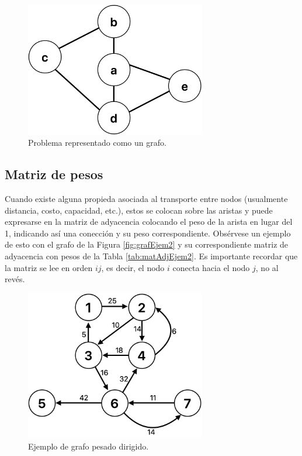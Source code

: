 \documentclass[12pt]{article}  %
\begin{document}
\begin{figure}[H]
\centering
\caption{Problema representado como un grafo.}
\label{fig:grafEjem}
\includegraphics[width=0.7\textwidth]{grafoEjemploAdj.png}
\end{figure}

\subsection{Matriz de pesos}
Cuando existe alguna propieda asociada al transporte entre nodos (usualmente distancia, costo, capacidad, etc.), estos se colocan sobre las aristas y puede expresarse en la matriz de adyacencia colocando el peso de la arista en lugar del 1, indicando así una conección y su peso correspondiente. Obsérvese un ejemplo de esto con el grafo de la Figura \ref{fig:grafEjem2} y su correspondiente matriz de adyacencia con pesos de la Tabla \ref{tab:matAdjEjem2}.
Es importante recordar que la matriz se lee en orden $ij$, es decir, el nodo $i$ conecta hacia el nodo $j$, no al revés.

\begin{figure}[H]
\centering
\caption{Ejemplo de grafo pesado dirigido.}
\label{fig:grafEjem}
\includegraphics[width=0.7\textwidth]{grafEjem2.png}
\end{figure}
\end{document}
